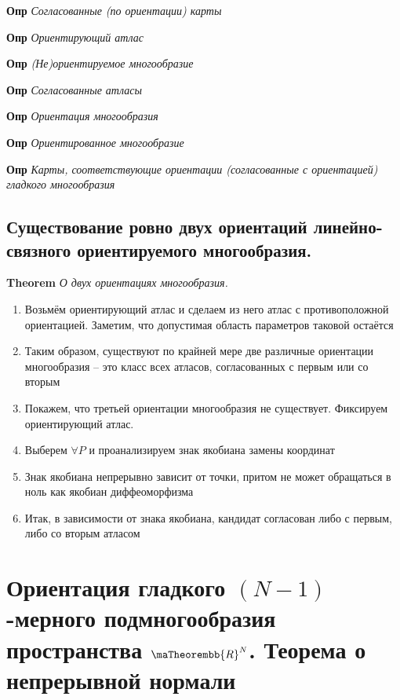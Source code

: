 \documentclass[a4paper, 14pt]{article}
\begin{document}
    \textbf{Опр} \textit{Согласованные (по ориентации) карты}
    
    \textbf{Опр} \textit{Ориентирующий атлас}
    
    \textbf{Опр} \textit{(Не)ориентируемое многообразие}
    
    \textbf{Опр} \textit{Согласованные атласы}
    
    \textbf{Опр} \textit{Ориентация многообразия}
    
    \textbf{Опр} \textit{Ориентированное многообразие}
    
    \textbf{Опр} \textit{Карты, соответствующие ориентации (согласованные с ориентацией) гладкого многообразия}
    
    \subsection{Существование ровно двух ориентаций линейно-связного ориентируемого многообразия.}
    
    \textbf{Theorem} \textit{О двух ориентациях многообразия.}
    
    \begin{enumerate}
        \item Возьмём ориентирующий атлас и сделаем из него атлас с противоположной ориентацией.
        Заметим, что допустимая область параметров таковой остаётся
        \item Таким образом, существуют по крайней мере две различные ориентации многообразия -- это класс всех
        атласов, согласованных с первым или со вторым
        \item Покажем, что третьей ориентации многообразия не существует.
        Фиксируем ориентирующий атлас.
        \item Выберем $\forall P$ и проанализируем знак якобиана замены координат
        \item Знак якобиана непрерывно зависит от точки, притом не может обращаться в ноль как якобиан диффеоморфизма
        \item Итак, в зависимости от знака якобиана, кандидат согласован либо с первым, либо со вторым атласом
    \end{enumerate}
    
    \section{Ориентация гладкого $(N - 1)$-мерного подмногообразия пространства $\maTheorembb{R}^N$.
    Теорема о непрерывной нормали}
    
\end{document}
